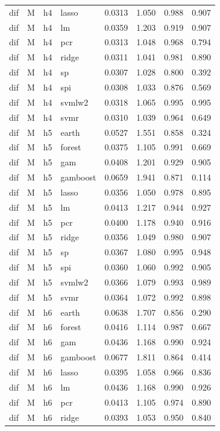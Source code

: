 \begin{ThreePartTable}
\begin{longtable}[t]{llclcccc}
dif & M & h4 & lasso & 0.0313 & 1.050 & 0.988 & 0.907\\
dif & M & h4 & lm & 0.0359 & 1.203 & 0.919 & 0.907\\
dif & M & h4 & pcr & 0.0313 & 1.048 & 0.968 & 0.794\\
dif & M & h4 & ridge & 0.0311 & 1.041 & 0.981 & 0.890\\
dif & M & h4 & sp & 0.0307 & 1.028 & 0.800 & 0.392\\
dif & M & h4 & spi & 0.0308 & 1.033 & 0.876 & 0.569\\
dif & M & h4 & svmlw2 & 0.0318 & 1.065 & 0.995 & 0.995\\
dif & M & h4 & svmr & 0.0310 & 1.039 & 0.964 & 0.649\\
\addlinespace
dif & M & h5 & earth & 0.0527 & 1.551 & 0.858 & 0.324\\
dif & M & h5 & forest & 0.0375 & 1.105 & 0.991 & 0.669\\
dif & M & h5 & gam & 0.0408 & 1.201 & 0.929 & 0.905\\
dif & M & h5 & gamboost & 0.0659 & 1.941 & 0.871 & 0.114\\
dif & M & h5 & lasso & 0.0356 & 1.050 & 0.978 & 0.895\\
dif & M & h5 & lm & 0.0413 & 1.217 & 0.944 & 0.927\\
dif & M & h5 & pcr & 0.0400 & 1.178 & 0.940 & 0.916\\
dif & M & h5 & ridge & 0.0356 & 1.049 & 0.980 & 0.907\\
dif & M & h5 & sp & 0.0367 & 1.080 & 0.995 & 0.948\\
dif & M & h5 & spi & 0.0360 & 1.060 & 0.992 & 0.905\\
dif & M & h5 & svmlw2 & 0.0366 & 1.079 & 0.993 & 0.989\\
dif & M & h5 & svmr & 0.0364 & 1.072 & 0.992 & 0.898\\
\addlinespace
dif & M & h6 & earth & 0.0638 & 1.707 & 0.856 & 0.290\\
dif & M & h6 & forest & 0.0416 & 1.114 & 0.987 & 0.667\\
dif & M & h6 & gam & 0.0436 & 1.168 & 0.990 & 0.924\\
dif & M & h6 & gamboost & 0.0677 & 1.811 & 0.864 & 0.414\\
dif & M & h6 & lasso & 0.0395 & 1.058 & 0.966 & 0.836\\
dif & M & h6 & lm & 0.0436 & 1.168 & 0.990 & 0.926\\
dif & M & h6 & pcr & 0.0413 & 1.105 & 0.974 & 0.890\\
dif & M & h6 & ridge & 0.0393 & 1.053 & 0.950 & 0.840\\

\end{longtable}
\end{ThreePartTable}
